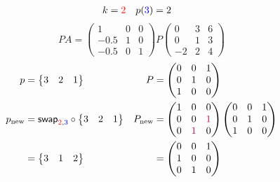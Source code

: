 \documentclass[pdf]{beamer}
\begin{document}
\begin{frame}{}\begin{align*} k &= {\color{red}2} & p({\color{blue}3}) &= 2\end{align*} $$PA=\begin{pmatrix}1&0&0\\-0.5&1&0\\-0.5&0&1\end{pmatrix} P \begin{pmatrix}0&\boxed{3}&6\\0&1&3\\-2&2&4\end{pmatrix} $$ \begin{align*} p&= \begin{Bmatrix}3&2&1\end{Bmatrix} & P&= \begin{pmatrix}0&0&1\\0&1&0\\1&0&0\end{pmatrix}\\ p_{\text{new}} &= \mathsf{swap}_{{\color{red}2},{\color{blue}3}} \circ \begin{Bmatrix}3&2&1\end{Bmatrix} & P_{\text{new}} &= \begin{pmatrix}1&0&0\\0&0&{\color{purple}1}\\0&{\color{purple}1}&0\end{pmatrix} \begin{pmatrix}0&0&1\\0&1&0\\1&0&0\end{pmatrix}\\ &=\begin{Bmatrix}3&1&2\end{Bmatrix} &&=\begin{pmatrix}0&0&1\\1&0&0\\0&1&0\end{pmatrix}\end{align*}\end{frame}
\end{document}
